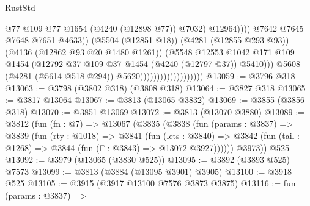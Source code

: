 \begin{lexlean}{RustStd}
\begin{coremodule}
                                                          @77
                                                          @109
                                                          @77
                                                          @1654
                                                          (@4240 (@12898 @77))
                                                          @7032)
                                                        @12964))))
                                                @7642
                                                @7645
                                                @7648
                                                @7651
                                                @4633))
                                            (@5504 (@12851 @18))
                                            (@4281 (@12855 @293 @93))
                                            (@4136 (@12862 @93 @20 @1480 @1261))
                                            (@5548
                                              @12553
                                              @1042
                                              @171
                                              @109
                                              @1454
                                              (@12792
                                                @37
                                                @109
                                                @37
                                                @1454
                                                (@4240 (@12797 @37))
                                                @5410)))
                                          @5608
                                          (@4281 (@5614 @518 @294))
                                          @5620)))))))))))))))))))
@13059 := @3796 @318
@13063 := @3798 (@3802 @318) (@3808 @318)
@13064 := @3827 @318
@13065 := @3817 @13064
@13067 := @3813 (@13065 @3832)
@13069 := @3855 (@3856 @318)
@13070 := @3851 @13069
@13072 := @3813 (@13070 @3880)
@13089 := @3812
    (fun (fn : @7) =>
    @13067
      (@3835
        (@3838
          (fun (params : @3837) =>
          @3839
            (fun (rty : @1018) =>
            @3841
              (fun (lets : @3840) =>
              @3842 (fun (tail : @1268) => @3844 (fun (Γ : @3843) => @13072 @3927))))))
        @3973))
    @525
@13092 := @3979 (@13065 (@3830 @525))
@13095 := @3892 (@3893 @525) @7573
@13099 := @3813 (@3884 (@13095 @3901) @3905)
@13100 := @3918 @525
@13105 := @3915 (@3917 @13100 @7576 @3873 @3875)
@13116 := fun (params : @3837) =>

\end{coremodule}
\end{lexlean}
